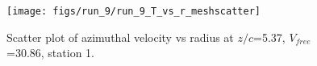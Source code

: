 \begin{figure}[H]
\centering
\texttt{[image: figs/run\_9/run\_9\_T\_vs\_r\_meshscatter]}
\caption{Scatter plot of azimuthal velocity vs radius at $z/c$=5.37, $V_{free}$=30.86, station 1.}
\label{fig:run_9_T_vs_r_meshscatter}
\end{figure}


